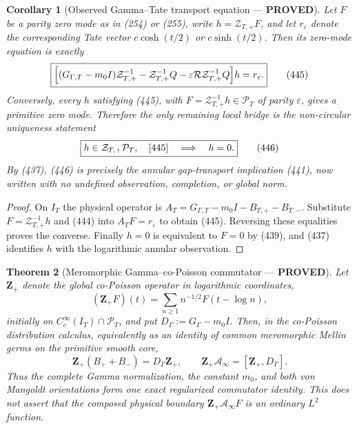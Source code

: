 \documentclass[11pt]{article}
\newtheorem{theorem}{Theorem}
\newtheorem{corollary}[theorem]{Corollary}
\newcommand{\PROVED}{\textcolor{green!45!black}{\textbf{PROVED}}}
\begin{document}
\begin{corollary}[Observed Gamma--Tate transport equation --- \PROVED]
Let $F$ be a parity zero mode as in (254) or (255), write
$h=\mathcal Z_{T,+}F$, and let
$r_\varepsilon$ denote the corresponding Tate vector
$c\cosh(t/2)$ or $c\sinh(t/2)$.  Then its zero-mode equation is exactly
\begin{equation}
 \boxed{
 \Bigl[(G_{\Gamma,T}-m_0I)\mathcal Z_{T,+}^{-1}
 -\mathcal Z_{T,+}^{-1}Q
 -\varepsilon\mathcal R\mathcal Z_{T,+}^{-1}Q\Bigr]h
 =r_\varepsilon.}                                  \tag{445}
\end{equation}
Conversely, every $h$ satisfying (445), with
$F=\mathcal Z_{T,+}^{-1}h\in\mathcal P_T$ of parity $\varepsilon$, gives a
primitive zero mode.  Therefore the only remaining local bridge is the
non-circular uniqueness statement
\begin{equation}
 \boxed{
 h\in\mathcal Z_{T,+}\mathcal P_T,\quad
 \eqref{445}
 \quad\Longrightarrow\quad h=0.}                   \tag{446}
\end{equation}
By (437), (446) is precisely the annular gap-transport implication (441),
now written with no undefined observation, completion, or global norm.
\end{corollary}

\begin{proof}
On $I_T$ the physical operator is
$A_T=G_{\Gamma,T}-m_0I-B_{T,+}-B_{T,-}$.  Substitute
$F=\mathcal Z_{T,+}^{-1}h$ and (444) into
$A_TF=r_\varepsilon$ to obtain (445).  Reversing these equalities proves
the converse.  Finally $h=0$ is equivalent to $F=0$ by (439), and (437)
identifies $h$ with the logarithmic annular observation.
\end{proof}

\begin{theorem}[Meromorphic Gamma--co-Poisson commutator --- \PROVED]
Let \(\mathbf Z_+\) denote the global co-Poisson operator in logarithmic
coordinates,
\[
 (\mathbf Z_+F)(t)=\sum_{n\ge1}n^{-1/2}F(t-\log n),
\]
initially on \(C_c^\infty(I_T)\cap\mathcal P_T\), and put
\(D_\Gamma:=G_\Gamma-m_0I\).  Then, in the co-Poisson distribution
calculus, equivalently as an identity of common meromorphic Mellin germs on
the primitive smooth core,
\begin{equation}
 \boxed{
 \mathbf Z_+(B_++B_-)=D_\Gamma\mathbf Z_+,\qquad
 \mathbf Z_+\mathcal A_\infty
   =[\mathbf Z_+,D_\Gamma].}                         \tag{447}
\end{equation}
Thus the complete Gamma normalization, the constant \(m_0\), and both
von Mangoldt orientations form one exact regularized commutator identity.
This does not assert that the composed physical boundary
\(\mathbf Z_+\mathcal A_\infty F\) is an ordinary \(L^2\) function.
\end{theorem}
\end{document}
